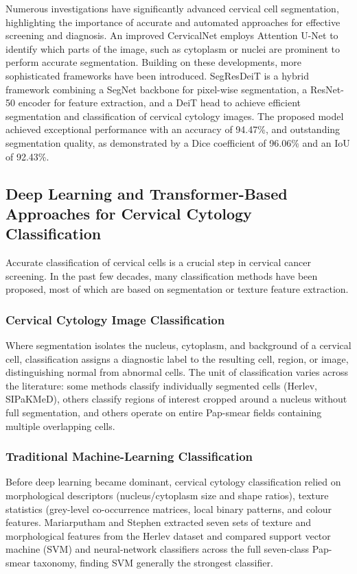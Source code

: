 \documentclass[pdflatex,sn-nature]{sn-jnl}%
\theoremstyle{thmstyleone}%
\theoremstyle{thmstyletwo}%
\theoremstyle{thmstylethree}%
\begin{document}
Numerous investigations have significantly advanced cervical cell segmentation, highlighting the importance of accurate and automated approaches for effective screening and diagnosis. An improved CervicalNet\cite{Lite32} employs Attention U-Net to identify which parts of the image, such as cytoplasm or nuclei are prominent to perform accurate segmentation. Building on these developments, more sophisticated frameworks have been introduced. SegResDeiT\cite{Lite33} is a hybrid framework combining a SegNet backbone for pixel-wise segmentation, a ResNet-50 encoder for feature extraction, and a DeiT head to achieve efficient segmentation and classification of cervical cytology images. The proposed model achieved exceptional performance with an accuracy of 94.47\%, and outstanding segmentation quality, as demonstrated by a Dice coefficient of 96.06\% and an IoU of 92.43\%. 

\subsection{Deep Learning and Transformer-Based Approaches for Cervical Cytology Classification}

Accurate classification of cervical cells is a crucial step in cervical cancer screening. In the past few decades, many classification methods have been proposed, most of which are based on segmentation or texture feature extraction\cite{Lite34}. 

\subsubsection{Cervical Cytology Image Classification}

Where segmentation isolates the nucleus, cytoplasm, and background of a cervical cell, classification assigns a diagnostic label to the resulting cell, region, or image,  distinguishing normal from abnormal cells. The unit of classification varies across the literature: some methods classify individually segmented cells (Herlev, SIPaKMeD), others classify regions of interest cropped around a nucleus without full segmentation, and others operate on entire Pap-smear fields containing multiple overlapping cells\cite{Lite36}. 

\subsubsection{Traditional Machine-Learning Classification}

Before deep learning became dominant, cervical cytology classification relied on morphological descriptors (nucleus/cytoplasm size and shape ratios), texture statistics (grey-level co-occurrence matrices, local binary patterns, and colour features. Mariarputham and Stephen\cite{Lite37} extracted seven sets of texture and morphological features from the Herlev dataset and compared support vector machine (SVM) and neural-network classifiers across the full seven-class Pap-smear taxonomy, finding SVM generally the strongest classifier. 
\end{document}
